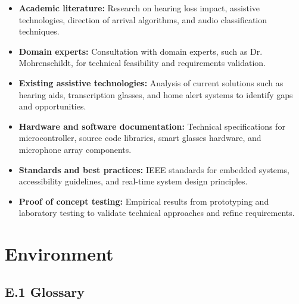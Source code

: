 \documentclass[12pt]{article}
\theoremstyle{definition}
\begin{document}
\begin{itemize}
\item \textbf{Academic literature:} Research on hearing loss impact,
assistive technologies, direction of arrival algorithms, and audio
classification techniques.

\item \textbf{Domain experts:}\label{itm:domain-experts} Consultation with domain experts, such as 
Dr. Mohrenschildt, for technical feasibility and requirements validation.

\item \textbf{Existing assistive technologies:} Analysis of current solutions
such as hearing aids, transcription glasses, and home alert systems to
identify gaps and opportunities.

\item \textbf{Hardware and software documentation:} Technical specifications
for microcontroller, source code libraries, smart glasses hardware,
and microphone array components.

\item \textbf{Standards and best practices:} IEEE standards for embedded
systems, accessibility guidelines, and real-time system design principles.

\item \textbf{Proof of concept testing:} Empirical results from prototyping
and laboratory testing to validate technical approaches and refine
requirements.
\end{itemize}


\section{Environment}

\subsection{E.1 Glossary}
\end{document}
